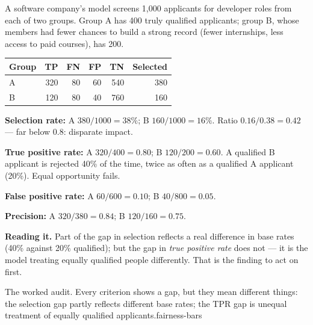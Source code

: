 \begin{worked}
A software company's model screens 1{,}000 applicants for developer roles from each of
two groups. Group A has 400 truly qualified applicants; group B, whose members had fewer
chances to build a strong record (fewer internships, less access to paid courses), has
200.

\smallskip
\begin{center}
\begin{tabular}{@{}lrrrrr@{}}
\toprule
\textbf{Group} & \textbf{TP} & \textbf{FN} & \textbf{FP} & \textbf{TN} & \textbf{Selected} \\
\midrule
A & 320 & 80 & 60 & 540 & 380 \\
B & 120 & 80 & 40 & 760 & 160 \\
\bottomrule
\end{tabular}
\end{center}
\smallskip
\begin{tight}
  \item \textbf{Selection rate:} A $380/1000 = 38\%$; B $160/1000 = 16\%$. Ratio
        $0.16/0.38 = \mathbf{0.42}$ --- far below 0.8: disparate impact.
  \item \textbf{True positive rate:} A $320/400 = 0.80$; B $120/200 = \mathbf{0.60}$. A
        qualified B applicant is rejected 40\% of the time, twice as often as a
        qualified A applicant (20\%). Equal opportunity fails.
  \item \textbf{False positive rate:} A $60/600 = 0.10$; B $40/800 = 0.05$.
  \item \textbf{Precision:} A $320/380 = 0.84$; B $120/160 = 0.75$.
\end{tight}
\textbf{Reading it.} Part of the gap in selection reflects a real difference in base
rates (40\% against 20\% qualified); but the gap in \emph{true positive rate} does not ---
it is the model treating equally qualified people differently. That is the finding to
act on first.
\end{worked}

%
{The worked audit. Every criterion shows a gap, but they mean different things: the
selection gap partly reflects different base rates; the TPR gap is unequal treatment of
equally qualified applicants.}{fairness-bars}

